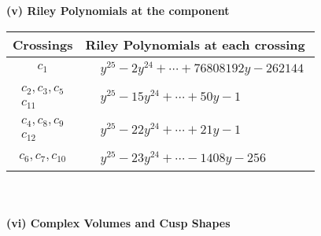 \documentclass[1p]{elsarticle_modified}
\theoremstyle{definition}
\begin{document}
\newpage\renewcommand{\arraystretch}{1}
\flushleft \textbf{(v) Riley Polynomials at the component}\newline \\
\begin{tabular}{m{50pt}|m{274pt}}
Crossings & \hspace{64pt}Riley Polynomials at each crossing \\
\hline $$\begin{aligned}c_{1}\end{aligned}$$&$\begin{aligned}
&y^{25}-2 y^{24}+\cdots+76808192 y-262144
\end{aligned}$\\
\hline $$\begin{aligned}c_{2},c_{3},c_{5}\\c_{11}\end{aligned}$$&$\begin{aligned}
&y^{25}-15 y^{24}+\cdots+50 y-1
\end{aligned}$\\
\hline $$\begin{aligned}c_{4},c_{8},c_{9}\\c_{12}\end{aligned}$$&$\begin{aligned}
&y^{25}-22 y^{24}+\cdots+21 y-1
\end{aligned}$\\
\hline $$\begin{aligned}c_{6},c_{7},c_{10}\end{aligned}$$&$\begin{aligned}
&y^{25}-23 y^{24}+\cdots-1408 y-256
\end{aligned}$\\
\hline
\end{tabular}\\~\\
\newpage\flushleft \textbf{(vi) Complex Volumes and Cusp Shapes}
\end{document}
